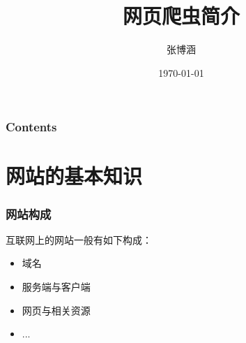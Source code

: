 \documentclass[9pt]{beamer}
\title{网页爬虫简介}
\author{张博涵}
\institute{北京航空航天大学}
\date{\today}
\begin{document}
\begin{frame}[plain]
\maketitle
\end{frame}


\begin{frame}
    \frametitle{Contents}

    \tableofcontents

\end{frame}


\section{网站的基本知识}

\begin{frame}
    \frametitle{网站构成}

互联网上的网站一般有如下构成：

\begin{itemize}
    \item 域名
    \item 服务端与客户端
    \item 网页与相关资源
    \item ...
\end{itemize}




\end{frame}
\end{document}
